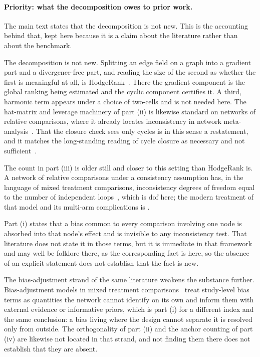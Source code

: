 \paragraph{Priority: what the decomposition owes to prior work.} The main text states that the
decomposition is not new. This is the accounting behind that, kept here because it is a claim
about the literature rather than about the benchmark.

The decomposition is not new. Splitting an edge field on a graph into a
gradient part and a divergence-free part, and reading the size of the second as whether the first
is meaningful at all, is HodgeRank~\citep{jiang2011hodgerank}. There the gradient component is
the global ranking being estimated and the cyclic component certifies it. A third, harmonic term
appears under a choice of two-cells and is not needed here. The hat-matrix and
leverage machinery of part (ii) is likewise standard on networks of relative comparisons, where it
already locates inconsistency in network meta-analysis~\citep{krahn2013graphical}. That the closure
check sees only cycles is in this sense a restatement, and it matches the long-standing
reading of cycle closure as necessary and not sufficient~\citep{mey2020alchem}.

The count in part (iii) is older still and closer to this setting than HodgeRank is. A network of
relative comparisons under a consistency assumption has, in the language of mixed treatment
comparisons, inconsistency degrees of freedom equal to the number of independent
loops~\citep{lu2006inconsistency}, which is $\mathrm{dof}$ here; the modern treatment of that model
and its multi-arm complications is \citet{higgins2012inconsistency}.

Part (i) states that a bias common to every comparison involving one node is absorbed into that
node's effect and is invisible to any inconsistency test. That literature does not state it in
those terms, but it is immediate in that framework and may well be folklore there, as the
corresponding fact is here, so the absence of an explicit statement does not establish that the
fact is new.

The bias-adjustment strand of the same literature weakens the substance further.
Bias-adjustment models in mixed treatment comparisons~\citep{dias2010bias} treat study-level bias
terms as quantities the network cannot identify on its own and inform them with external evidence
or informative priors, which is part (i) for a different index and the same conclusion: a bias
living where the design cannot separate it is resolved only from outside. The orthogonality of part
(ii) and the anchor counting of part (iv) are likewise not located in that strand, and not finding
them there does not establish that they are absent.

